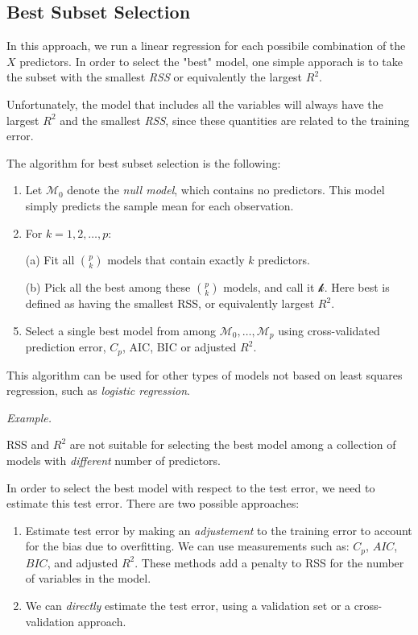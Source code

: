 \subsection*{Best Subset Selection}
In this approach, we run a linear regression for each possibile combination of the $X$ predictors. In order to select the "best" model, one simple apporach is to take the subset with the smallest \textit{RSS} or equivalently the largest $R^2$.

Unfortunately, the model that includes all the variables will always have the largest $R^2$ and the smallest \textit{RSS}, since these quantities are related to the training error.

The algorithm for best subset selection is the following:
\begin{enumerate}
    \item Let $\mathcal{M}_0$ denote the \textit{null model}, which contains no predictors. This model simply predicts the sample mean for each observation.
    \item For $k = 1,2,\dots, p$:
    \item[(a)] Fit all $\binom{p}{k}$ models that contain exactly $k$ predictors.
    \item[(b)] Pick all the best among these $\binom{p}{k}$ models, and call it $\mathcal{k}$. Here best is defined as having the smallest RSS, or equivalently largest $R^2$.
    \item Select a single best model from among $\mathcal{M}_0, \dots, \mathcal{M}_p$ using cross-validated prediction error, $C_p$, AIC, BIC or adjusted $R^2$.
\end{enumerate}

This algorithm can be used for other types of models not based on least squares regression, such as \textit{logistic regression}.

\textit{Example. }

RSS and $R^2$ are not suitable for selecting the best model among a collection of models with \textit{different} number of predictors.

In order to select the best model with respect to the test error, we need to estimate this test error. There are two possible approaches:
\begin{enumerate}
    \item Estimate test error by making an \textit{adjustement} to the training error to account for the bias due to overfitting. We can use measurements such as: $C_p$, $AIC$, $BIC$, and adjusted $R^2$. These methods add a penalty to RSS for the number of variables in the model.
    \item We can \textit{directly} estimate the test error, using a validation set or a cross-validation approach.
\end{enumerate}

